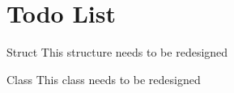 \chapter{Todo List}
\hypertarget{todo}{}\label{todo}

\begin{DoxyRefList}
\item[Struct \doxylink{structvia_1_1CompilerGlobal}{via\+::Compiler\+Global} ]\label{todo__todo000001}%
%
This structure needs to be redesigned  
\item[Class \doxylink{classvia_1_1GlobalHolder}{via\+::Global\+Holder} ]\label{todo__todo000002}%
%
This class needs to be redesigned 
\end{DoxyRefList}